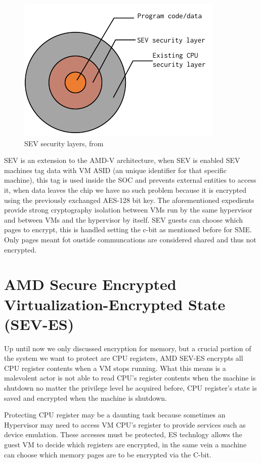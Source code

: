 \documentclass[twocolumn]{article}
\begin{document}
    \begin{figure}
        \centering
        \includegraphics[scale=0.9]{img/security-layers.pdf}
        \caption{SEV security layers, from \cite{memory-encryption}}
    \end{figure}

    SEV is an extension to the AMD-V architecture, when SEV is enabled SEV machines tag data with VM ASID (an unique identifier for that specific machine), this tag is used inside the SOC and prevents external entities to access it, when data leaves the chip we have no such problem because it is encrypted using the previously exchanged AES-128 bit key. The aforementioned expedients provide strong cryptography isolation between VMs run by the same hypervisor and between VMs and the hypervisor by itself. SEV guests can choose which pages to encrypt, this is handled setting the c-bit as mentioned before for SME. Only pages meant fot oustide communcations are considered shared and thus not encrypted.

\section{AMD Secure Encrypted Virtualization-Encrypted State (SEV-ES)}

    Up until now we only discussed encryption for memory, but a crucial portion of the system we want to protect are CPU registers, AMD SEV-ES encrypts all CPU register contents when a VM stops running. What this means is a malevolent actor is not able to read CPU's register contents when the machine is shutdown no matter the privilege level he acquired before, CPU register's state is saved and encrypted when the machine is shutdown.

    Protecting CPU register may be a daunting task because sometimes an Hypervisor may need to access VM CPU's register to provide services such as device emulation. These accesses must be protected, ES technlogy allows the guest VM to decide which registers are encrypted, in the same vein a machine can choose which memory pages are to be encrypted via the C-bit.
\end{document}
